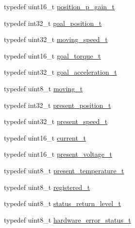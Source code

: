 \begin{DoxyCompactItemize}
typedef uint16\+\_\+t \hyperlink{structdynamixel_1_1servos_1_1_model_traits_3_01_pro_l4210_s300_01_4_1_1_c_t_aebb994d92076f6cecb26f2a860337a01}{position\+\_\+p\+\_\+gain\+\_\+t}
\item 
typedef int32\+\_\+t \hyperlink{structdynamixel_1_1servos_1_1_model_traits_3_01_pro_l4210_s300_01_4_1_1_c_t_aeab8fab2a9e5bb4cb646ae2e630a98c0}{goal\+\_\+position\+\_\+t}
\item 
typedef uint32\+\_\+t \hyperlink{structdynamixel_1_1servos_1_1_model_traits_3_01_pro_l4210_s300_01_4_1_1_c_t_ac2631f641c38eb37fbc54239729ef1d3}{moving\+\_\+speed\+\_\+t}
\item 
typedef uint16\+\_\+t \hyperlink{structdynamixel_1_1servos_1_1_model_traits_3_01_pro_l4210_s300_01_4_1_1_c_t_a8b2df0d4592070ea75bc10910bed1509}{goal\+\_\+torque\+\_\+t}
\item 
typedef uint32\+\_\+t \hyperlink{structdynamixel_1_1servos_1_1_model_traits_3_01_pro_l4210_s300_01_4_1_1_c_t_a40cec82771868e3614a1489a21b958c3}{goal\+\_\+acceleration\+\_\+t}
\item 
typedef uint8\+\_\+t \hyperlink{structdynamixel_1_1servos_1_1_model_traits_3_01_pro_l4210_s300_01_4_1_1_c_t_a42a38cd3598c4462201ea14a57495df5}{moving\+\_\+t}
\item 
typedef int32\+\_\+t \hyperlink{structdynamixel_1_1servos_1_1_model_traits_3_01_pro_l4210_s300_01_4_1_1_c_t_a0ff1ff311486fb86faa373bf49168119}{present\+\_\+position\+\_\+t}
\item 
typedef uint32\+\_\+t \hyperlink{structdynamixel_1_1servos_1_1_model_traits_3_01_pro_l4210_s300_01_4_1_1_c_t_a1795f31f839b6ce95836d78e163cbab9}{present\+\_\+speed\+\_\+t}
\item 
typedef uint16\+\_\+t \hyperlink{structdynamixel_1_1servos_1_1_model_traits_3_01_pro_l4210_s300_01_4_1_1_c_t_a6f66da0b92c18fc5cd9f27ff28596b23}{current\+\_\+t}
\item 
typedef uint16\+\_\+t \hyperlink{structdynamixel_1_1servos_1_1_model_traits_3_01_pro_l4210_s300_01_4_1_1_c_t_ae84f8f351693a3626306b9ac6ac70df5}{present\+\_\+voltage\+\_\+t}
\item 
typedef uint8\+\_\+t \hyperlink{structdynamixel_1_1servos_1_1_model_traits_3_01_pro_l4210_s300_01_4_1_1_c_t_aeeae9215a584bbb0f10568f5d4406af9}{present\+\_\+temperature\+\_\+t}
\item 
typedef uint8\+\_\+t \hyperlink{structdynamixel_1_1servos_1_1_model_traits_3_01_pro_l4210_s300_01_4_1_1_c_t_a84752720a80ce0d14097af2156b7bacc}{registered\+\_\+t}
\item 
typedef uint8\+\_\+t \hyperlink{structdynamixel_1_1servos_1_1_model_traits_3_01_pro_l4210_s300_01_4_1_1_c_t_afe1f0e2c18594039d8bd9cc9a4cc4fde}{status\+\_\+return\+\_\+level\+\_\+t}
\item 
typedef uint8\+\_\+t \hyperlink{structdynamixel_1_1servos_1_1_model_traits_3_01_pro_l4210_s300_01_4_1_1_c_t_a1269e6b4436be957fdc5117ff248906a}{hardware\+\_\+error\+\_\+status\+\_\+t}
\end{DoxyCompactItemize}
